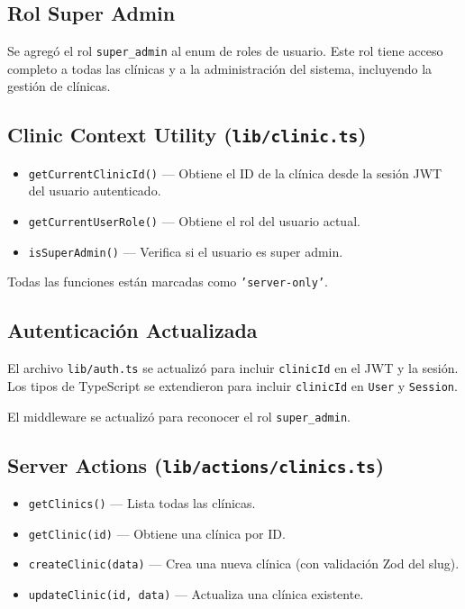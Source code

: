 \documentclass[12pt,a4paper]{article}
\begin{document}
\subsection{Rol Super Admin}

Se agregó el rol \texttt{super\_admin} al enum de roles de usuario. Este rol
tiene acceso completo a todas las clínicas y a la administración del sistema,
incluyendo la gestión de clínicas.

\subsection{Clinic Context Utility (\texttt{lib/clinic.ts})}

\begin{itemize}[leftmargin=*]
    \item \texttt{getCurrentClinicId()} --- Obtiene el ID de la clínica desde
          la sesión JWT del usuario autenticado.
    \item \texttt{getCurrentUserRole()} --- Obtiene el rol del usuario actual.
    \item \texttt{isSuperAdmin()} --- Verifica si el usuario es super admin.
\end{itemize}

Todas las funciones están marcadas como \texttt{'server-only'}.

\subsection{Autenticación Actualizada}

El archivo \texttt{lib/auth.ts} se actualizó para incluir \texttt{clinicId}
en el JWT y la sesión. Los tipos de TypeScript se extendieron para incluir
\texttt{clinicId} en \texttt{User} y \texttt{Session}.

El middleware se actualizó para reconocer el rol \texttt{super\_admin}.

\subsection{Server Actions (\texttt{lib/actions/clinics.ts})}

\begin{itemize}[leftmargin=*]
    \item \texttt{getClinics()} --- Lista todas las clínicas.
    \item \texttt{getClinic(id)} --- Obtiene una clínica por ID.
    \item \texttt{createClinic(data)} --- Crea una nueva clínica (con validación
          Zod del slug).
    \item \texttt{updateClinic(id, data)} --- Actualiza una clínica existente.
\end{itemize}
\end{document}
